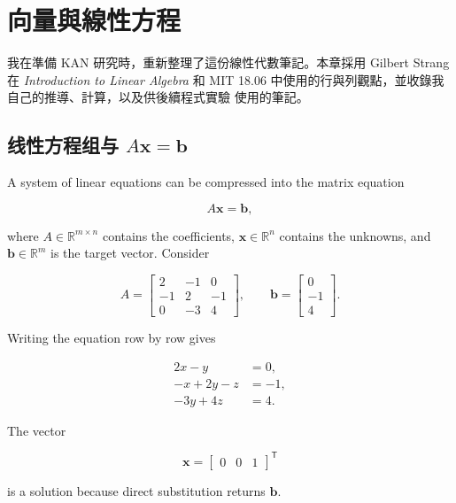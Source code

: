 \setchapterpreamble[u]{\margintoc}
\chapter{向量與線性方程}

{\small
我在準備 KAN 研究時，重新整理了這份線性代數筆記。本章採用
Gilbert Strang 在 \emph{Introduction to Linear Algebra} 和 MIT 18.06
中使用的行與列觀點，並收錄我自己的推導、計算，以及供後續程式實驗
使用的筆記。\par}

\section[\zhHans 线性方程组]{\zhHans 线性方程组与
\texorpdfstring{$A\mathbf{x}=\mathbf{b}$}{Ax=b}}

A system of linear equations can be compressed into the matrix equation

\[
    A\mathbf{x}=\mathbf{b},
\]

where \(A\in\mathbb{R}^{m\times n}\) contains the coefficients,
\(\mathbf{x}\in\mathbb{R}^{n}\) contains the unknowns, and
\(\mathbf{b}\in\mathbb{R}^{m}\) is the target vector. Consider

\[
    A=
    \begin{bmatrix}
        2 & -1 & 0 \\
        -1 & 2 & -1 \\
        0 & -3 & 4
    \end{bmatrix},
    \qquad
    \mathbf{b}=
    \begin{bmatrix}
        0 \\
        -1 \\
        4
    \end{bmatrix}.
\]

Writing the equation row by row gives

\begin{align*}
    2x-y       &= 0, \\
    -x+2y-z    &= -1, \\
    -3y+4z     &= 4.
\end{align*}

The vector

\[
    \mathbf{x}=
    \begin{bmatrix}0&0&1\end{bmatrix}^{\mathsf T}
\]

is a solution because direct substitution returns \(\mathbf{b}\).

